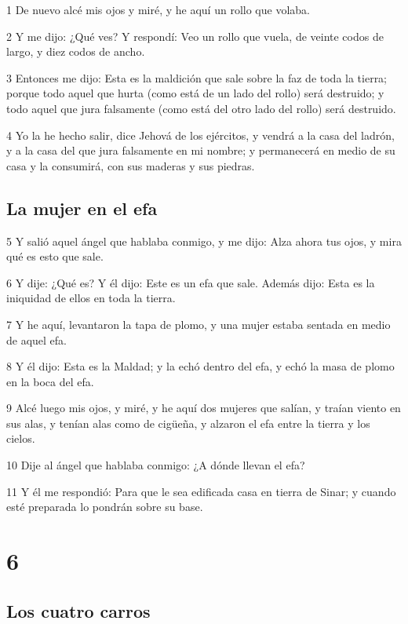 \par 1 De nuevo alcé mis ojos y miré, y he aquí un rollo que volaba.
\par 2 Y me dijo: ¿Qué ves? Y respondí: Veo un rollo que vuela, de veinte codos   de largo, y diez codos de ancho.
\par 3 Entonces me dijo: Esta es la maldición que sale sobre la faz de toda la tierra; porque todo aquel que hurta (como está de un lado del rollo) será destruido; y todo aquel que jura falsamente (como está del otro lado del rollo) será destruido.
\par 4 Yo la he hecho salir, dice Jehová de los ejércitos, y vendrá a la casa del ladrón, y a la casa del que jura falsamente en mi nombre; y permanecerá en medio de su casa y la consumirá, con sus maderas y sus piedras.

\section*{La mujer en el efa}

\par 5 Y salió aquel ángel que hablaba conmigo, y me dijo: Alza ahora tus ojos, y mira qué es esto que sale.
\par 6 Y dije: ¿Qué es? Y él dijo: Este es un efa que sale. Además dijo: Esta es la iniquidad de ellos en toda la tierra.
\par 7 Y he aquí, levantaron la tapa de plomo, y una mujer estaba sentada en medio de aquel efa. 
\par 8 Y él dijo: Esta es la Maldad; y la echó dentro del efa, y echó la masa de plomo en la boca del efa.
\par 9 Alcé luego mis ojos, y miré, y he aquí dos mujeres que salían, y traían viento en sus alas, y tenían alas como de cigüeña, y alzaron el efa entre la tierra y los cielos.
\par 10 Dije al ángel que hablaba conmigo: ¿A dónde llevan el efa?
\par 11 Y él me respondió: Para que le sea edificada casa en tierra de Sinar; y cuando esté preparada lo pondrán sobre su base.

\chapter{6}

\section*{Los cuatro carros}

